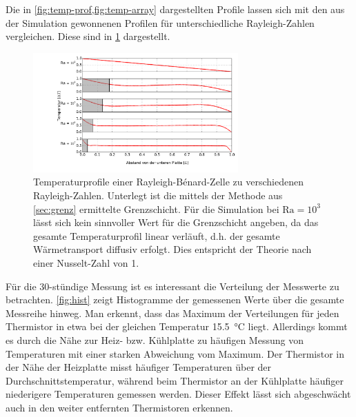 Die in \cref{fig:temp-prof,fig:temp-array} dargestellten Profile lassen sich mit den aus der Simulation gewonnenen Profilen für unterschiedliche Rayleigh-Zahlen vergleichen.
Diese sind in \cref{fig:sim-temp} dargestellt.
\\
\begin{figure}
	\centering
	\includegraphics[width=0.7\textwidth]{plots/T_sim_Profile.pdf}
	\caption{Temperaturprofile einer Rayleigh-B\'enard-Zelle zu verschiedenen Rayleigh-Zahlen. Unterlegt ist die mittels der Methode aus \cref{sec:grenz} ermittelte Grenzschicht. Für die Simulation bei $\text{Ra}=10^3$ lässt sich kein sinnvoller Wert für die Grenzschicht angeben, da das gesamte Temperaturprofil linear verläuft, d.h. der gesamte Wärmetransport diffusiv erfolgt. Dies entspricht der Theorie nach einer Nusselt-Zahl von 1.}\label{fig:sim-temp}
\end{figure}
Für die 30-stündige Messung ist es interessant die Verteilung der Messwerte zu betrachten. \cref{fig:hist} zeigt Histogramme der gemessenen Werte über die gesamte Messreihe hinweg. Man erkennt, dass das Maximum der Verteilungen für jeden Thermistor in etwa bei der gleichen Temperatur \SI{15.5}{\celsius} liegt. 
Allerdings kommt es durch die Nähe zur Heiz- bzw. Kühlplatte zu häufigen Messung von Temperaturen mit einer starken Abweichung vom Maximum.
Der Thermistor in der Nähe der Heizplatte misst häufiger Temperaturen über der Durchschnittstemperatur, während beim Thermistor an der Kühlplatte häufiger niederigere Temperaturen gemessen werden.
Dieser Effekt lässt sich abgeschwächt auch in den weiter entfernten Thermistoren erkennen.

